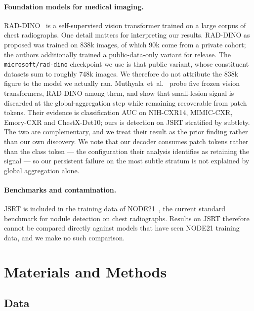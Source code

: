 \documentclass[11pt,a4paper]{article}
\begin{document}
\paragraph{Foundation models for medical imaging.}
RAD-DINO~\cite{perezgarcia2024raddino} is a self-supervised vision transformer
trained on a large corpus of chest radiographs. One detail matters for
interpreting our results. RAD-DINO as proposed was trained on 838k images, of
which 90k come from a private cohort; the authors additionally trained a
public-data-only variant for release. The \texttt{microsoft/rad-dino} checkpoint
we use is that public variant, whose constituent datasets sum to roughly 748k
images. We therefore do not attribute the 838k figure to the model we actually
ran.
Muthyala~et~al.~\cite{muthyala2026frozen} probe five frozen vision transformers,
RAD-DINO among them, and show that small-lesion signal is discarded at the
global-aggregation step while remaining recoverable from patch tokens. Their
evidence is classification AUC on NIH-CXR14, MIMIC-CXR, Emory-CXR and
ChestX-Det10; ours is detection on JSRT stratified by subtlety. The two are
complementary, and we treat their result as the prior finding rather than our
own discovery. We note that our decoder consumes patch tokens rather than the
class token --- the configuration their analysis identifies as retaining the
signal --- so our persistent failure on the most subtle stratum is not
explained by global aggregation alone.

\paragraph{Benchmarks and contamination.}
JSRT is included in the training data of NODE21~\cite{sogancioglu2024node21}, the current
standard benchmark for nodule detection on chest radiographs. Results on JSRT
therefore cannot be compared directly against models that have seen NODE21
training data, and we make no such comparison.

\section{Materials and Methods}

\subsection{Data}
\end{document}
